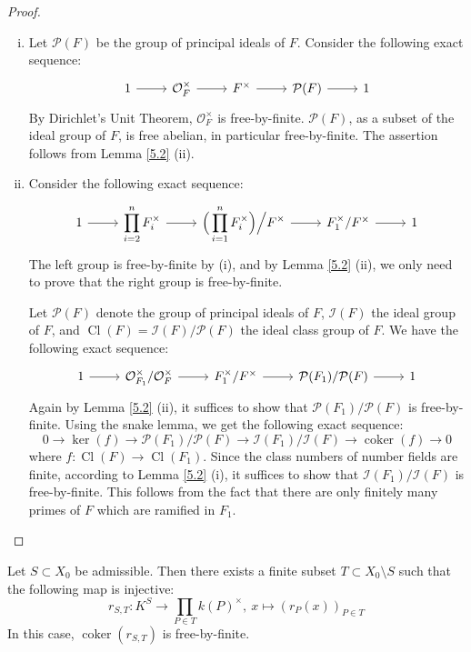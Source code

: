 \begin{proof}
\begin{enumerate}[(i)]
\item Let $\mathcal{P}(F)$ be the group of principal ideals of $F$. Consider the following exact sequence:
\[ \begin{tikzcd}
1 \ar[r] & \mathcal{O}_F^\times \ar[r] & F^\times \ar[r]& \mathcal{P}(F) \ar[r] & 1
\end{tikzcd} \]
By Dirichlet's Unit Theorem, $\mathcal{O}_F^\times$ is free-by-finite. $\mathcal{P}(F)$, as a subset of the ideal group of $F$, is free abelian, in particular free-by-finite. The assertion follows from Lemma \ref{5.2} (ii).
\item Consider the following exact sequence:
\[ \begin{tikzcd}
1 \ar[r] & \displaystyle \prod_{i=2}^{n} F_i^\times \ar[r]& \displaystyle \Big(\prod_{i=1}^{n}F_i^\times\Big)\Big/F^\times \ar[r]& F_1^\times/F^\times \ar[r]& 1
\end{tikzcd} \]
The left group is free-by-finite by (i), and by Lemma \ref{5.2} (ii), we only need to prove that the right group is free-by-finite.

Let $\mathcal{P}(F)$ denote the group of principal ideals of $F$, $\mathcal{I}(F)$ the ideal group of $F$, and $\operatorname{Cl}(F) = \mathcal{I}(F)/\mathcal{P}(F)$ the ideal class group of $F$. We have the following exact sequence:
\[ \begin{tikzcd}
1 \ar[r]& \mathcal{O}_{F_1}^\times /\mathcal{O}_F^\times\ar[r] & F_1^\times / F^\times\ar[r] & \mathcal{P}(F_1)/\mathcal{P}(F)\ar[r] & 1
\end{tikzcd} \]
Again by Lemma \ref{5.2} (ii), it suffices to show that $\mathcal{P}(F_1)/\mathcal{P}(F)$ is free-by-finite. Using the snake lemma, we get the following exact sequence:
\[
0 \longrightarrow \ker(f)\longrightarrow \mathcal{P}(F_1)/\mathcal{P}(F)\longrightarrow \mathcal{I}(F_1)/\mathcal{I}(F)
\longrightarrow \operatorname{coker}(f)\longrightarrow 0 \]
where $f:\operatorname{Cl}(F)\to \operatorname{Cl}(F_1)$. Since the class numbers of number fields are finite, according to Lemma \ref{5.2} (i), it suffices to show that $\mathcal{I}(F_1)/\mathcal{I}(F)$ is free-by-finite. This follows from the fact that there are only finitely many primes of $F$ which are ramified in $F_1$.\qedhere
\end{enumerate}
\end{proof}

\begin{lemma}\label{5.4}
Let $S\subset X_0$ be admissible. Then there exists a finite subset $T\subset X_0\setminus S$ such that the following map is injective:
\[ r_{S,T}:K^S \to\prod_{P\in T}k(P)^\times,\ x\mapsto(r_P(x))_{P\in T} \]
In this case, $\operatorname{coker}(r_{S,T})$ is free-by-finite.
\end{lemma}

